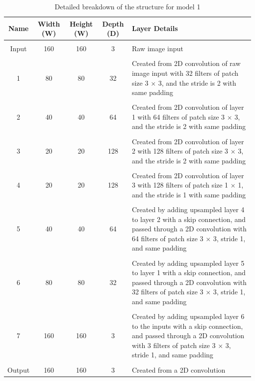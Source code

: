 \documentclass[a4paper]{article}
\begin{document}
\begin{table}[h]
\centering
\caption{Detailed breakdown of the structure for model 1}\scriptsize
\begin{tabular}{ccccp{8cm}}
\toprule
\textbf{Name} & \textbf{Width (W)} & \textbf{Height (W)} & \textbf{Depth (D)} & Layer Details\\  
\midrule
 & & & &\\
Input & 160 & 160 & 3 & Raw image input\\
 & & & &\\
1 & 80 & 80 & 32 & Created from 2D convolution of raw image input with 32 filters of patch size 3 $\times $ 3, and the stride is 2 with same padding\\
 & & & &\\
2 & 40 & 40 & 64 & Created from 2D convolution of layer 1 with 64 filters of patch size 3 $\times $ 3, and the stride is 2 with same padding\\
 & & & &\\
3 & 20 & 20 & 128 & Created from 2D convolution of layer 2 with 128 filters of patch size 3 $\times$ 3, and the stride is 2 with same padding\\
 & & & &\\
4 & 20 & 20 & 128 & Created from 2D convolution of layer 3 with 128 filters of patch size 1 $\times$ 1, and the stride is 1 with same padding\\
 & & & &\\
5 & 40 & 40 & 64 & Created by adding upsampled layer 4 to layer 2 with a skip connection, and passed through a 2D convolution with 64 filters of patch size 3 $\times$ 3, stride 1, and same padding\\
 & & & &\\
6 & 80 & 80 & 32 & Created by adding upsampled layer 5 to layer 1 with a skip connection, and passed through a 2D convolution with 32 filters of patch size 3 $\times$ 3, stride 1, and same padding\\
 & & & &\\
7 & 160 & 160 & 3 & Created by adding upsampled layer 6 to the inputs with a skip connection, and passed through a 2D convolution with 3 filters of patch size 3 $\times$ 3, stride 1, and same padding\\
& & & &\\
Output & 160 & 160 & 3 & Created from a 2D convolution\\
\bottomrule
\end{tabular}
\end{table}
\end{document}
